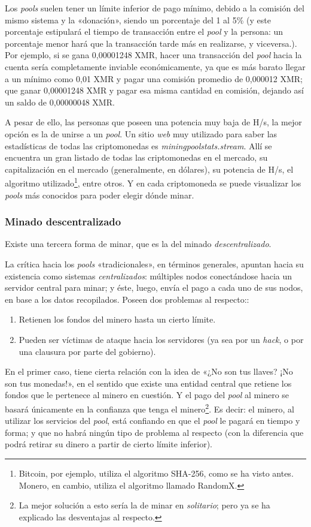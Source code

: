 \documentclass[12pt,a4paper,twoside]{book}
\begin{document}
Los \textit{pools} suelen tener un límite inferior de pago mínimo, debido a la comisión del mismo sistema y la «donación», siendo un porcentaje del 1 al 5\% (y este porcentaje estipulará el tiempo de transacción entre el \textit{pool} y la persona: un porcentaje menor hará que la transacción tarde más en realizarse, y viceversa.). Por ejemplo, si se gana 0,00001248 XMR, hacer una transacción del \textit{pool} hacia la cuenta sería completamente inviable económicamente, ya que es más barato llegar a un mínimo como 0,01 XMR y pagar una comisión promedio de 0,000012 XMR; que ganar 0,00001248 XMR y pagar esa misma cantidad en comisión, dejando así un saldo de 0,00000048 XMR.

A pesar de ello, las personas que poseen una potencia muy baja de H/s, la mejor opción es la de unirse a un \textit{pool}. Un sitio \textit{web} muy utilizado para saber las estadísticas de todas las criptomonedas es 
\textit{miningpoolstats.stream}. Allí se encuentra un gran listado de todas las criptomonedas en el mercado, su capitalización en el mercado (generalmente, en dólares), su potencia de H/s, el algoritmo utilizado\footnote{Bitcoin, por ejemplo, utiliza el algoritmo SHA-256, como se ha visto antes. Monero, en cambio, utiliza el algoritmo llamado RandomX.}, entre otros. Y en cada criptomoneda se puede visualizar los \textit{pools} más conocidos para poder elegir dónde minar.

\subsubsection{Minado descentralizado}
Existe una tercera forma de minar, que es la del minado \textit{descentralizado}.

La crítica hacia los \textit{pools} «tradicionales», en términos generales, apuntan hacia su existencia como sistemas \textit{centralizados}: múltiples nodos conectándose hacia un servidor central para minar; y éste, luego, envía el pago a cada uno de sus nodos, en base a los datos recopilados. Poseen dos problemas al respecto::

\begin{enumerate}
\item Retienen los fondos del minero hasta un cierto límite.
\item Pueden ser víctimas de ataque hacia los servidores (ya sea por un \textit{hack}, o por una clausura por parte del gobierno).
\end{enumerate}

En el primer caso, tiene cierta relación con la idea de «¿No son tus llaves? ¡No son tus monedas!», en el sentido que existe una entidad central que retiene los fondos que le pertenece al minero en cuestión. Y el pago del \textit{pool} al minero se basará únicamente en la confianza que tenga el minero\footnote{La mejor solución a esto sería la de minar en \textit{solitario}; pero ya se ha explicado las desventajas al respecto.}. Es decir: el minero, al utilizar los servicios del \textit{pool}, está confiando en que el \textit{pool} le pagará en tiempo y forma; y que no habrá ningún tipo de problema al respecto (con la diferencia que podrá retirar su dinero a partir de cierto límite inferior).
\end{document}
